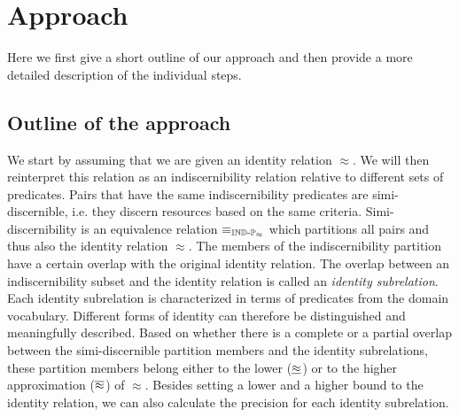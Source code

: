 \section{Approach}
\label{sec:approach}

Here we first give a short outline of our approach and then
  provide a more detailed description of the individual steps.

\subsection{Outline of the approach}

We start by assuming that we are given an identity relation $\approx$.
We will then reinterpret this relation as an indiscernibility relation
  relative to different sets of predicates.
Pairs that have the same indiscernibility predicates
  are simi-discernible, i.e. they discern resources
  based on the same criteria.
Simi-discernibility is an equivalence relation $\equiv_{\operatorname{{\mathbb{IND}-\mathbb{P}}}_{\approx}}$
  which partitions all pairs and thus also the identity relation $\approx$.
The members of the indiscernibility partition
  have a certain overlap with the original identity relation.
The overlap between an indiscernibility subset and the identity relation
  is called an \emph{identity subrelation}.
Each identity subrelation is characterized in terms of predicates
  from the domain vocabulary.
Different forms of identity can therefore be distinguished
  and meaningfully described.
Based on whether there is a complete or a partial overlap
  between the simi-discernible partition members and
  the identity subrelations,
  these partition members belong either to the lower ($\underline{\approx}$)
  or to the higher approximation ($\overline{\approx}$) of $\approx$.
Besides setting a lower and a higher bound to the identity relation,
  we can also calculate the precision for each identity subrelation.




